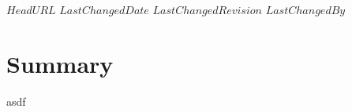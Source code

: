 \svnidlong
{$HeadURL$}
{$LastChangedDate$}
{$LastChangedRevision$}
{$LastChangedBy$}

\section{Summary}
asdf
